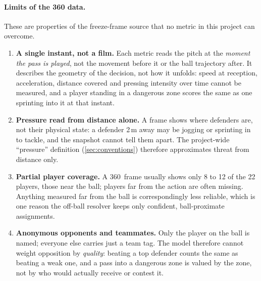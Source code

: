 \documentclass[12pt,a4paper]{article}
\begin{document}
\paragraph{Limits of the 360 data.}
These are properties of the freeze-frame source that no metric in this project can overcome.
\begin{enumerate}
    \item \textbf{A single instant, not a film.} Each metric reads the pitch at the \emph{moment the pass is played}, not the movement before it or the ball trajectory after. It describes the geometry of the decision, not how it unfolds: speed at reception, acceleration, distance covered and pressing intensity over time cannot be measured, and a player standing in a dangerous zone scores the same as one sprinting into it at that instant.

    \item \textbf{Pressure read from distance alone.} A frame shows where defenders are, not their physical state: a defender 2\,m away may be jogging or sprinting in to tackle, and the snapshot cannot tell them apart. The project-wide ``pressure'' definition (\cref{sec:conventions}) therefore approximates threat from distance only.

    \item \textbf{Partial player coverage.} A 360~frame usually shows only 8 to 12 of the 22 players, those near the ball; players far from the action are often missing. Anything measured far from the ball is correspondingly less reliable, which is one reason the off-ball resolver keeps only confident, ball-proximate assignments.

    \item \textbf{Anonymous opponents and teammates.} Only the player on the ball is named; everyone else carries just a team tag. The model therefore cannot weight opposition by \emph{quality}: beating a top defender counts the same as beating a weak one, and a pass into a dangerous zone is valued by the zone, not by who would actually receive or contest it.
\end{enumerate}
\end{document}
